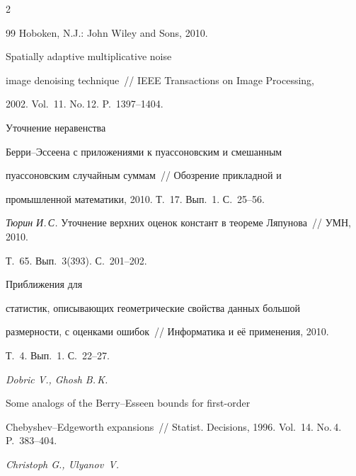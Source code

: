 \begin{multicols}{2}
{{\begin{thebibliography}{99}
Hoboken, N.J.: John Wiley and Sons, 2010.







 Spatially adaptive multiplicative noise


image denoising technique~// IEEE Transactions on Image Processing,


2002. Vol.~11. No.\,12. P.~1397--1404.







 Уточнение неравенства


Берри--Эссеена с приложениями к пуассоновским и смешанным


пуассоновским случайным суммам~// Обозрение прикладной и


промышленной математики, 2010. Т.~17. Вып.~1. С.~25--56.







\emph{Тюрин И.\,С.}  Уточнение верхних оценок констант в теореме Ляпунова~// УМН, 2010. 


Т.~65. Вып.~3(393). С.~201--202.







 Приближения для


статистик, описывающих геометрические свойства данных большой


размерности, с оценками ошибок~// Информатика и её применения, 2010.


Т.~4. Вып.~1. С.~22--27.







\emph{Dobric V., Ghosh B.\,K.} 


Some analogs of the Berry--Esseen bounds for first-order


Chebyshev--Edgeworth expansions~// Statist. Decisions, 1996. Vol.~14. No.\,4. P.~383--404.







\emph{Christoph G., Ulyanov~V.}



\end{thebibliography}}}
\end{multicols}
